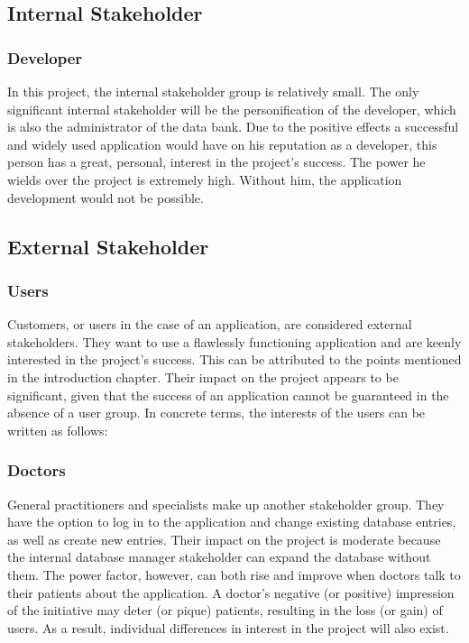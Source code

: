 \subsection{Internal Stakeholder}
\subsubsection{Developer}
In this project, the internal stakeholder group is relatively small. The only significant internal stakeholder will be the personification of the developer, which is also the administrator of the data bank. Due to the positive effects a successful and widely used application would have on his reputation as a developer, this person has a great, personal, interest in the project's success. The power he wields over the project is extremely high. Without him, the application development would not be possible.

\subsection{External Stakeholder}
\subsubsection{Users}
Customers, or users in the case of an application, are considered external stakeholders. They want to use a flawlessly functioning application and are keenly interested in the project's success. This can be attributed to the points mentioned in the introduction chapter. Their impact on the project appears to be significant, given that the success of an application cannot be guaranteed in the absence of a user group.
In concrete terms, the interests of the users can be written as follows:
\subsubsection{Doctors}
General practitioners and specialists make up another stakeholder group. They have the option to log in to the application and change existing database entries, as well as create new entries. Their impact on the project is moderate because the internal database manager stakeholder can expand the database without them. The power factor, however, can both rise and improve when doctors talk to their patients about the application. A doctor's negative (or positive) impression of the initiative may deter (or pique) patients, resulting in the loss (or gain) of users. As a result, individual differences in interest in the project will also exist.

